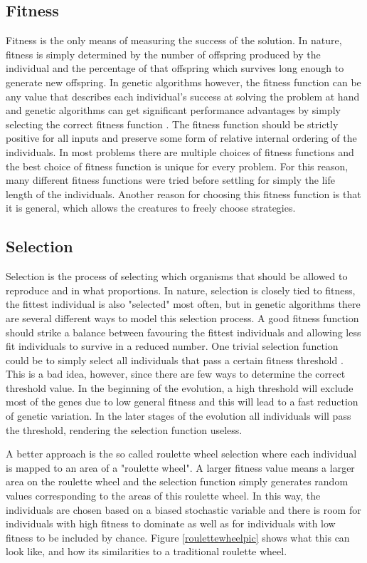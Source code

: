 \documentclass[a4paper,11pt]{kth-mag}
\begin{document}
\subsection{Fitness}
Fitness is the only means of measuring the success of the solution. In nature, fitness is simply determined by the number of offspring produced by the individual and the percentage of that offspring which survives long enough to generate new offspring\cite[p.~117]{darwin}. In genetic algorithms however, the fitness function can be any value that describes each individual's success at solving the problem at hand and genetic algorithms can get significant performance advantages by simply selecting the correct fitness function \cite{marsland}. The fitness function should be strictly positive for all inputs and preserve some form of relative internal ordering of the individuals. In most problems there are multiple choices of fitness functions and the best choice of fitness function is unique for every problem\cite{marsland}. For this reason, many different fitness functions were tried before settling for simply the life length of the individuals. Another reason for choosing this fitness function is that it is general, which allows the creatures to freely choose strategies.

\subsection{Selection}
Selection is the process of selecting which organisms that should be allowed to reproduce and in what proportions. In nature, selection is closely tied to fitness, the fittest individual is also "selected" most often, but in genetic algorithms there are several different ways to model this selection process. A good fitness function should strike a balance between favouring the fittest individuals and allowing less fit individuals to survive in a reduced number.  One trivial selection function could be to simply select all individuals that pass a certain fitness threshold \cite{marsland}. This is a bad idea, however, since there are few ways to determine the correct threshold value. In the beginning of the evolution, a high threshold will exclude most of the genes due to low general fitness and this will lead to a fast reduction of genetic variation. In the later stages of the evolution all individuals will pass the threshold, rendering the selection function useless.

A better approach is the so called roulette wheel selection where each individual is mapped to an area of a "roulette wheel". A larger fitness value means a larger area on the roulette wheel and the selection function simply generates random values corresponding to the areas of this roulette wheel. In this way, the individuals are chosen based on a biased stochastic variable and there is room for individuals with high fitness to dominate as well as for individuals with low fitness to be included by chance. Figure \ref{roulettewheelpic} shows what this can look like, and how its similarities to a traditional roulette wheel.
\end{document}
